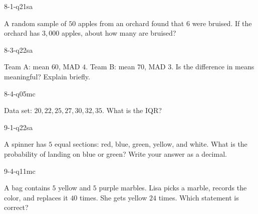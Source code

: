 \begin{practiceQuestion}{8-1-q21}{sa}
\begin{questionText}
A random sample of $50$ apples from an orchard found that $6$ were bruised. If the orchard has $3{,}000$ apples, about how many are bruised?
\end{questionText}
\end{practiceQuestion}

\begin{practiceQuestion}{8-3-q22}{sa}
\begin{questionText}
Team A: mean $60$, MAD $4$. Team B: mean $70$, MAD $3$. Is the difference in means meaningful? Explain briefly.
\end{questionText}
\end{practiceQuestion}

\begin{practiceQuestion}{8-4-q05}{mc}
\begin{questionText}
Data set: $20, 22, 25, 27, 30, 32, 35$. What is the IQR?
\end{questionText}
\end{practiceQuestion}

\begin{practiceQuestion}{9-1-q22}{sa}
\begin{questionText}
A spinner has $5$ equal sections: red, blue, green, yellow, and white. What is the probability of landing on blue or green? Write your answer as a decimal.
\end{questionText}
\end{practiceQuestion}

\begin{practiceQuestion}{9-4-q11}{mc}
\begin{questionText}
A bag contains $5$ yellow and $5$ purple marbles. Lisa picks a marble, records the color, and replaces it $40$ times. She gets yellow $24$ times. Which statement is correct?
\end{questionText}
\end{practiceQuestion}

